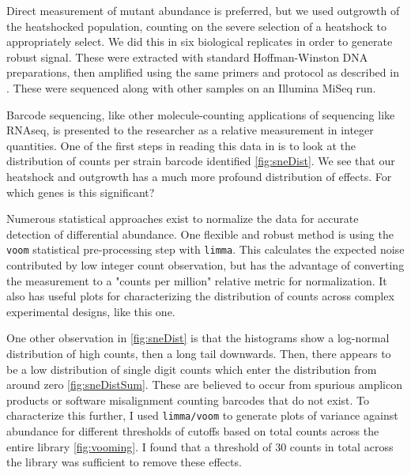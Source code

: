 Direct measurement of mutant abundance is preferred, but we used
outgrowth of the heatshocked population, counting on the severe
selection of a heatshock to appropriately select.
We did this in six biological replicates in order to generate robust
signal.
These were extracted with standard Hoffman-Winston DNA preparations,
then amplified using the same primers and protocol as described in
\parencite{robinson2013design}. These were sequenced along with other
samples on an Illumina MiSeq run.

Barcode sequencing, like other molecule-counting applications of
sequencing like RNAseq, is presented to the researcher as a relative 
measurement in integer quantities. 
One of the first steps in reading this data in is to look at the
distribution of counts per strain barcode identified
\autoref{fig:sneDist}.
We see that our heatshock and outgrowth has a much more profound
distribution of effects.
For which genes is this significant?


Numerous statistical approaches
exist to normalize the data for accurate detection of differential
abundance. One flexible and robust method is using the \texttt{voom}
statistical pre-processing step with \texttt{limma}. 
This calculates
the expected noise contributed by low integer count observation, but
has the advantage of converting the measurement to a "counts per
million" relative metric for normalization. 
It also has useful plots for characterizing the distribution of counts
across complex experimental designs, like this one.

One other observation in \autoref{fig:sneDist} is that the histograms
show a log-normal distribution of high counts, then a long tail
downwards. 
Then, there appears to be a low distribution of single digit counts
which enter the distribution from around zero \autoref{fig:sneDistSum}.
These are believed to occur from spurious amplicon products or
software misalignment counting barcodes that do not exist.
To characterize this further, I used \texttt{limma/voom} to generate
plots of variance against abundance for different thresholds of
cutoffs based on total counts across the entire library
\autoref{fig:vooming}.
I found that a threshold of 30 counts in total across the library
was sufficient to remove these effects.


